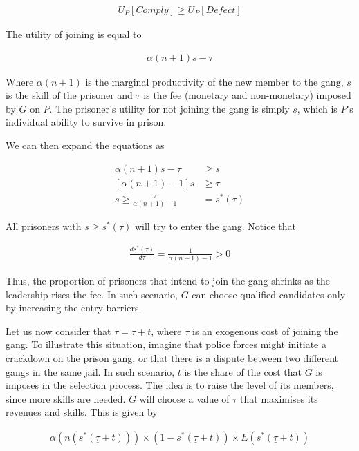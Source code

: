 \begin{align}
U_P [Comply] \geq U_P [Defect]
\end{align}

The utility of joining is equal to

\begin{align}
\alpha (n+1) s - \tau
\end{align}

Where $\alpha (n+1)$ is the marginal productivity of the new member to the gang, $s$ is the skill of the prisoner and $\tau$ is the fee (monetary and non-monetary) imposed by $G$ on $P$. The prisoner's utility for not joining the gang is simply $s$, which is $P$'s individual ability to survive in prison.

We can then expand the equations as

\begin{equation}
\begin{split}
\alpha (n+1) s - \tau &\geq s\\
[\alpha (n+1) -1] s &\geq \tau\\
s \geq \frac{\tau}{\alpha (n+1) -1} & = s^*(\tau)
\end{split}
\end{equation}

All prisoners with $s \geq s^*(\tau)$ will try to enter the gang. Notice that

\begin{align}
\frac{ds^*(\tau)}{d\tau} = \frac{1}{\alpha (n+1) -1} > 0
\end{align}

Thus, the proportion of prisoners that intend to join the gang shrinks as the leadership rises the fee. In such scenario, $G$ can choose qualified candidates only by increasing the entry barriers. 

Let us now consider that $\tau = \underline{\tau} + t$, where $\underline{\tau}$ is an exogenous cost of joining the gang. To illustrate this situation, imagine that police forces might initiate a crackdown on the prison gang, or that there is a dispute between two different gangs in the same jail. In such scenario, $t$ is the share of the cost that $G$ is imposes in the selection process. The idea is to raise the level of its members, since more skills are needed. $G$ will choose a value of $\tau$ that maximises its revenues and skills. This is given by

\begin{align}
\alpha (n(s^*(\underline{\tau} + t))) \times (1-s^*(\underline{\tau} +t)) \times E(s^*(\underline{\tau} + t))
\end{align}


